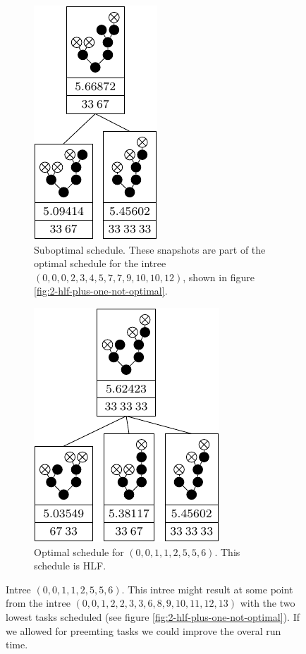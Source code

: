 \begin{figure}[ht]
  \centering
  \begin{subfigure}{.46\textwidth}
    \centering
    \includegraphics{p3/preemtive/00112556subopt.pdf}
    \caption{Suboptimal schedule. These snapshots are part of the optimal schedule for the intree $(0,0,0,2,3,4,5,7,7,9,10,10,12)$, shown in figure \ref{fig:2-hlf-plus-one-not-optimal}.}
    \label{fig:preemtive-better-bad-case}
  \end{subfigure}
  \quad
  \begin{subfigure}{.46\textwidth}
    \centering
    \includegraphics{p3/preemtive/00112556opt.pdf}
    \caption{Optimal schedule for $(0,0,1,1,2,5,5,6)$. This schedule is HLF.}
    \label{fig:preemtive-better-good-case}
  \end{subfigure}
  \caption{Intree $(0,0,1,1,2,5,5,6)$. This intree might result at some point from the intree $(0,0,1,2,2,3,3,6,8,9,10,11,12,13)$ with the two lowest tasks scheduled (see figure \ref{fig:2-hlf-plus-one-not-optimal}). If we allowed for preemting tasks we could improve the overal run time.}
  \label{fig:preemtive-is-better}
\end{figure}

